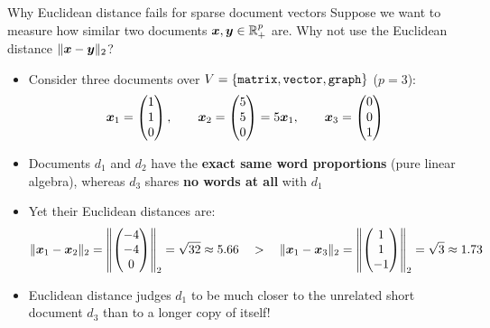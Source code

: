 \documentclass[aspectratio=169]{beamer}\usepackage[]{graphicx}\usepackage[]{xcolor}
\begin{document}
\begin{frame}{Why Euclidean distance fails for sparse document vectors}
Suppose we want to measure how similar two documents $\bm{x}, \bm{y} \in \mathbb{R}_+^p$ are. Why not use the Euclidean distance $\|\bm{x} - \bm{y}\|_2$?
\vfill
\begin{itemize}
\item Consider three documents over $V = \{{\tt matrix}, {\tt vector}, {\tt graph}\}$ ($p = 3$):
\[
\bm{x}_1 = \begin{pmatrix} 1 \\ 1 \\ 0 \end{pmatrix}, \qquad
\bm{x}_2 = \begin{pmatrix} 5 \\ 5 \\ 0 \end{pmatrix} = 5\bm{x}_1, \qquad
\bm{x}_3 = \begin{pmatrix} 0 \\ 0 \\ 1 \end{pmatrix}
\]
\item Documents $d_1$ and $d_2$ have the \textbf{exact same word proportions} (pure linear algebra), whereas $d_3$ shares \textbf{no words at all} with $d_1$
\vfill
\item Yet their Euclidean distances are:
\[
\|\bm{x}_1 - \bm{x}_2\|_2 = \left\|\begin{pmatrix} -4 \\ -4 \\ 0 \end{pmatrix}\right\|_2 = \sqrt{32} \approx 5.66
\quad > \quad
\|\bm{x}_1 - \bm{x}_3\|_2 = \left\|\begin{pmatrix} 1 \\ 1 \\ -1 \end{pmatrix}\right\|_2 = \sqrt{3} \approx 1.73
\]
\item Euclidean distance judges $d_1$ to be much closer to the unrelated short document $d_3$ than to a longer copy of itself!
\end{itemize}
\end{frame}
\end{document}
